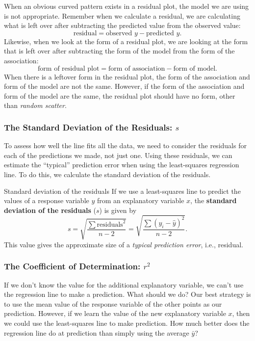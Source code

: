 When an obvious curved pattern exists in a residual plot, the model we are using is not appropriate. Remember when we calculate a residual, we are calculating what is left over after subtracting the predicted value from the observed value:
\[
    \text{residual} = \text{observed $y$} - \text{predicted $y$}.
\]
Likewise, when we look at the form of a residual plot, we are looking at the form that is left over after subtracting the form of the model from the form of the association:
\[
    \text{form of residual plot}
    = \text{form of association}
    - \text{form of model}.
\]
When there is a leftover form in the residual plot, the form of the association and form of the model are not the same. However, if the form of the association and form of the model are the same, the residual plot should have no form, other than \textit{random scatter}.

\subsubsection{The Standard Deviation of the Residuals: $s$}

To assess how well the line fits all the data, we need to consider the residuals for each of the predictions we made, not just one. Using these residuals, we can estimate the ``typical'' prediction error when using the least-squares regression line. To do this, we calculate the standard deviation of the residuals.

\begin{definition}{Standard deviation of the residuals}{}
    If we use a least-squares line to predict the values of a response variable $y$ from an explanatory variable $x$, the \textbf{standard deviation of the residuals} ($s$) is given by
    \[
        s
        = \sqrt{\dfrac{\sum\text{residuals}^2}{n-2}}
        = \sqrt{\dfrac{\sum(y_i - \hat{y})^2}{n-2}}.
    \]
    This value gives the approximate size of a \textit{typical prediction error}, i.e., residual.
\end{definition}

\subsubsection{The Coefficient of Determination: $r^2$}

If we don't know the value for the additional explanatory variable, we can't use the regression line to make a prediction. What should we do? Our best strategy is to use the mean value of the response variable of the other points as our prediction. However, if we learn the value of the new explanatory variable $x$, then we could use the least-squares line to make prediction. How much better does the regression line do at prediction than simply using the average $\bar{y}$?

